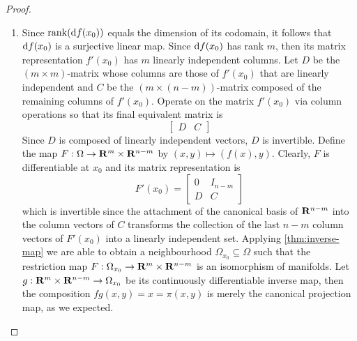 \begin{proof}
\begin{enumerate}
        \item Since \(\operatorname{rank}(\mathrm{d} f(x_0))\) equals the dimension of its codomain, it
              follows that \(\mathrm{d} f(x_0)\) is a surjective linear map. Since \(\mathrm{d}
              f(x_0)\) has rank \(m\), then its matrix representation \(f'(x_0)\) has
              \(m\) linearly independent columns. Let \(D\) be the \((m \times m)\)-matrix
              whose columns
              are those of \(f'(x_0)\) that are linearly independent and \(C\) be the
              \((m \times (n - m))\)-matrix composed of the remaining columns of
              \(f'(x_0)\). Operate on the matrix \(f'(x_0)\) via column operations so
              that its final equivalent matrix is
              \[
                  \begin{bmatrix}
                      D & C
                  \end{bmatrix}
              \]
              Since \(D\) is composed of linearly independent vectors, \(D\) is
              invertible. Define the map \(F: \Omega \to \mathbf{R}^m \times \mathbf{R}^{n-m}\) by \((x, y) \mapsto (f(x),
              y)\). Clearly, \(F\) is differentiable at \(x_0\) and its matrix
              representation is
              \[
                  F'(x_0) =
                  \begin{bmatrix}
                      0 & I_{n - m} \\
                      D & C
                  \end{bmatrix}
              \]
              which is invertible since the attachment of the canonical basis of
              \(\mathbf{R}^{n-m}\) into the column vectors of \(C\) transforms the collection of
              the last \(n - m\) column vectors of \(F'(x_{0})\) into a linearly
              independent set. Applying \cref{thm:inverse-map} we are able to obtain a
              neighbourhood \(\Omega_{x_0} \subseteq \Omega\) such that the restriction map \(F: \Omega_{x_0} \to
              \mathbf{R}^m \times\mathbf{R}^{n-m}\) is an isomorphism of manifolds. Let \(g: \mathbf{R}^m \times \mathbf{R}^{n-m} \to
              \Omega_{x_0}\) be its continuously differentiable inverse map, then the
              composition \(f g(x, y) = x = \pi(x, y)\) is merely the canonical projection
              map, as we expected.
    \end{enumerate}
\end{proof}

